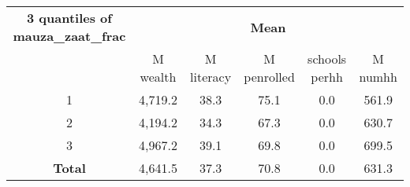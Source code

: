 \begin{tabular}{cccccc}
\textbf{3 quantiles of mauza\_zaat\_frac} & \multicolumn{5}{c}{\textbf{Mean}} \\
&M wealth&M literacy&M penrolled&schools perhh&M numhh \\
\hline
1&4,719.2&38.3&75.1&0.0&561.9 \\
2&4,194.2&34.3&67.3&0.0&630.7 \\
3&4,967.2&39.1&69.8&0.0&699.5 \\
\textbf{Total}&4,641.5&37.3&70.8&0.0&631.3 \\
\end{tabular}